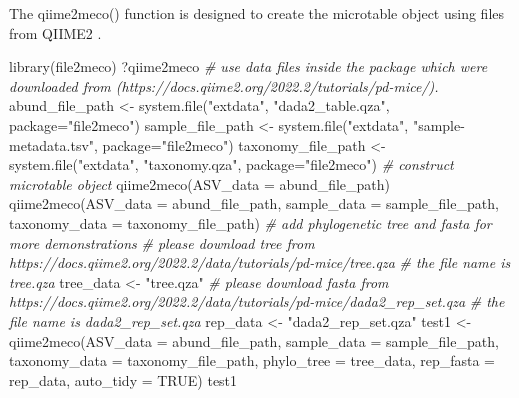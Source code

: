 \documentclass[
]{book}
\newenvironment{Shaded}{\begin{snugshade}}{\end{snugshade}}
\newcommand{\AttributeTok}[1]{\textcolor[rgb]{0.77,0.63,0.00}{#1}}
\newcommand{\CommentTok}[1]{\textcolor[rgb]{0.56,0.35,0.01}{\textit{#1}}}
\newcommand{\ConstantTok}[1]{\textcolor[rgb]{0.00,0.00,0.00}{#1}}
\newcommand{\FunctionTok}[1]{\textcolor[rgb]{0.00,0.00,0.00}{#1}}
\newcommand{\NormalTok}[1]{#1}
\newcommand{\OtherTok}[1]{\textcolor[rgb]{0.56,0.35,0.01}{#1}}
\newcommand{\StringTok}[1]{\textcolor[rgb]{0.31,0.60,0.02}{#1}}
\begin{document}
The qiime2meco() function is designed to create the microtable object using files from QIIME2 \citep{Bolyen_Reproducible_2019}.

\begin{Shaded}
\begin{Highlighting}[]
\FunctionTok{library}\NormalTok{(file2meco)}
\NormalTok{?qiime2meco}
\CommentTok{\# use data files inside the package which were downloaded from (https://docs.qiime2.org/2022.2/tutorials/pd{-}mice/).}
\NormalTok{abund\_file\_path }\OtherTok{\textless{}{-}} \FunctionTok{system.file}\NormalTok{(}\StringTok{"extdata"}\NormalTok{, }\StringTok{"dada2\_table.qza"}\NormalTok{, }\AttributeTok{package=}\StringTok{"file2meco"}\NormalTok{)}
\NormalTok{sample\_file\_path }\OtherTok{\textless{}{-}} \FunctionTok{system.file}\NormalTok{(}\StringTok{"extdata"}\NormalTok{, }\StringTok{"sample{-}metadata.tsv"}\NormalTok{, }\AttributeTok{package=}\StringTok{"file2meco"}\NormalTok{)}
\NormalTok{taxonomy\_file\_path }\OtherTok{\textless{}{-}} \FunctionTok{system.file}\NormalTok{(}\StringTok{"extdata"}\NormalTok{, }\StringTok{"taxonomy.qza"}\NormalTok{, }\AttributeTok{package=}\StringTok{"file2meco"}\NormalTok{)}
\CommentTok{\# construct microtable object}
\FunctionTok{qiime2meco}\NormalTok{(}\AttributeTok{ASV\_data =}\NormalTok{ abund\_file\_path)}
\FunctionTok{qiime2meco}\NormalTok{(}\AttributeTok{ASV\_data =}\NormalTok{ abund\_file\_path, }\AttributeTok{sample\_data =}\NormalTok{ sample\_file\_path, }\AttributeTok{taxonomy\_data =}\NormalTok{ taxonomy\_file\_path)}
\CommentTok{\# add phylogenetic tree and fasta for more demonstrations}
\CommentTok{\# please download tree from https://docs.qiime2.org/2022.2/data/tutorials/pd{-}mice/tree.qza}
\CommentTok{\# the file name is \textquotesingle{}tree.qza\textquotesingle{}}
\NormalTok{tree\_data }\OtherTok{\textless{}{-}} \StringTok{"tree.qza"}
\CommentTok{\# please download fasta from https://docs.qiime2.org/2022.2/data/tutorials/pd{-}mice/dada2\_rep\_set.qza}
\CommentTok{\# the file name is \textquotesingle{}dada2\_rep\_set.qza\textquotesingle{}}
\NormalTok{rep\_data }\OtherTok{\textless{}{-}} \StringTok{"dada2\_rep\_set.qza"}
\NormalTok{test1 }\OtherTok{\textless{}{-}} \FunctionTok{qiime2meco}\NormalTok{(}\AttributeTok{ASV\_data =}\NormalTok{ abund\_file\_path, }\AttributeTok{sample\_data =}\NormalTok{ sample\_file\_path, }\AttributeTok{taxonomy\_data =}\NormalTok{ taxonomy\_file\_path, }\AttributeTok{phylo\_tree =}\NormalTok{ tree\_data, }\AttributeTok{rep\_fasta =}\NormalTok{ rep\_data, }\AttributeTok{auto\_tidy =} \ConstantTok{TRUE}\NormalTok{)}
\NormalTok{test1}
\end{Highlighting}
\end{Shaded}
\end{document}
